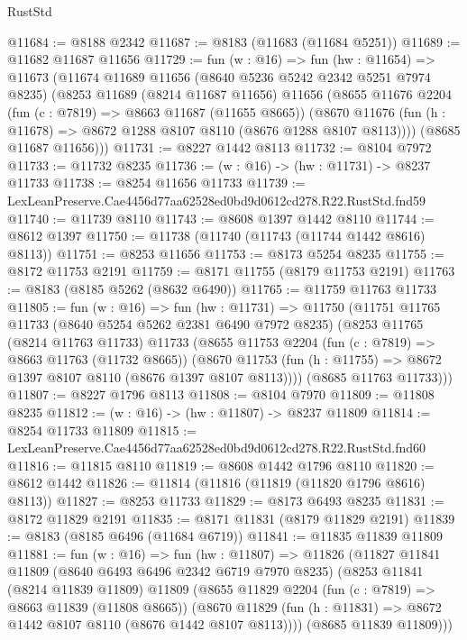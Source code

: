 \begin{lexlean}{RustStd}
\begin{coremodule}
@11684 := @8188 @2342
@11687 := @8183 (@11683 (@11684 @5251))
@11689 := @11682 @11687 @11656
@11729 := fun (w : @16) =>
  fun (hw : @11654) =>
  @11673
    (@11674
      @11689
      @11656
      (@8640 @5236 @5242 @2342 @5251 @7974 @8235)
      (@8253
        @11689
        (@8214 @11687 @11656)
        @11656
        (@8655
          @11676
          @2204
          (fun (c : @7819) => @8663 @11687 (@11655 @8665))
          (@8670 @11676 (fun (h : @11678) => @8672 @1288 @8107 @8110 (@8676 @1288 @8107 @8113))))
        (@8685 @11687 @11656)))
@11731 := @8227 @1442 @8113
@11732 := @8104 @7972
@11733 := @11732 @8235
@11736 := (w : @16) -> (hw : @11731) -> @8237 @11733
@11738 := @8254 @11656 @11733
@11739 := LexLeanPreserve.Cae4456d77aa62528ed0bd9d0612cd278.R22.RustStd.fnd59
@11740 := @11739 @8110
@11743 := @8608 @1397 @1442 @8110
@11744 := @8612 @1397
@11750 := @11738 (@11740 (@11743 (@11744 @1442 @8616) @8113))
@11751 := @8253 @11656
@11753 := @8173 @5254 @8235
@11755 := @8172 @11753 @2191
@11759 := @8171 @11755 (@8179 @11753 @2191)
@11763 := @8183 (@8185 @5262 (@8632 @6490))
@11765 := @11759 @11763 @11733
@11805 := fun (w : @16) =>
  fun (hw : @11731) =>
  @11750
    (@11751
      @11765
      @11733
      (@8640 @5254 @5262 @2381 @6490 @7972 @8235)
      (@8253
        @11765
        (@8214 @11763 @11733)
        @11733
        (@8655
          @11753
          @2204
          (fun (c : @7819) => @8663 @11763 (@11732 @8665))
          (@8670 @11753 (fun (h : @11755) => @8672 @1397 @8107 @8110 (@8676 @1397 @8107 @8113))))
        (@8685 @11763 @11733)))
@11807 := @8227 @1796 @8113
@11808 := @8104 @7970
@11809 := @11808 @8235
@11812 := (w : @16) -> (hw : @11807) -> @8237 @11809
@11814 := @8254 @11733 @11809
@11815 := LexLeanPreserve.Cae4456d77aa62528ed0bd9d0612cd278.R22.RustStd.fnd60
@11816 := @11815 @8110
@11819 := @8608 @1442 @1796 @8110
@11820 := @8612 @1442
@11826 := @11814 (@11816 (@11819 (@11820 @1796 @8616) @8113))
@11827 := @8253 @11733
@11829 := @8173 @6493 @8235
@11831 := @8172 @11829 @2191
@11835 := @8171 @11831 (@8179 @11829 @2191)
@11839 := @8183 (@8185 @6496 (@11684 @6719))
@11841 := @11835 @11839 @11809
@11881 := fun (w : @16) =>
  fun (hw : @11807) =>
  @11826
    (@11827
      @11841
      @11809
      (@8640 @6493 @6496 @2342 @6719 @7970 @8235)
      (@8253
        @11841
        (@8214 @11839 @11809)
        @11809
        (@8655
          @11829
          @2204
          (fun (c : @7819) => @8663 @11839 (@11808 @8665))
          (@8670 @11829 (fun (h : @11831) => @8672 @1442 @8107 @8110 (@8676 @1442 @8107 @8113))))
        (@8685 @11839 @11809)))

\end{coremodule}
\end{lexlean}
